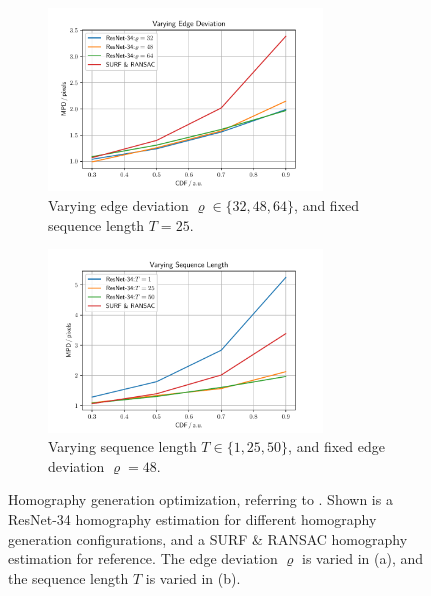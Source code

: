 \begin{figure}
\centering
\begin{subfigure}[b]{\textwidth}
    \centering
    \includegraphics[width=0.8\textwidth]{fig/frac/var_rho.pdf}
    \caption{Varying edge deviation $\varrho\in\{32,48,64\}$, and fixed sequence length $T=25$.}
    \label{c2:fig:resnet34_a}
\end{subfigure}
\begin{subfigure}[b]{\textwidth}
    \centering
    \includegraphics[width=0.8\textwidth]{fig/frac/var_seq.pdf}
    \caption{Varying sequence length $T\in\{1,25,50\}$, and fixed edge deviation $\varrho=48$.}
    \label{c2:fig:resnet34_b}
\end{subfigure}
\caption{Homography generation optimization, referring to . Shown is a ResNet-34 homography estimation for different homography generation configurations, and a SURF \& RANSAC homography estimation for reference. The edge deviation $\varrho$ is varied in (a), and the sequence length $T$ is varied in (b).}
\label{c2:fig:resnet34}
\end{figure}

